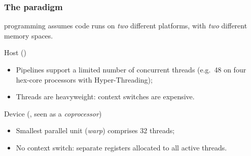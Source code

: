 \begin{frame}
	\frametitle{The \cuda{} paradigm}
	\cuda{} programming assumes code runs on \emph{two} different platforms, with \emph{two} different memory spaces.
	\begin{block}{Host (\cpu)}
		\begin{itemize}
			\item Pipelines support a limited number of concurrent threads (e.g.~48 on four hex-core processors with Hyper-Threading);
			\item Threads are heavyweight: context switches are expensive.
		\end{itemize}
	\end{block}

	\begin{block}{Device (\gpu, seen as a \emph{coprocessor})}
		\begin{itemize}
			\item Smallest parallel unit (\emph{warp}) comprises 32 threads;
			\item No context switch: separate registers allocated to all active threads.
		\end{itemize}
	\end{block}
\end{frame}
